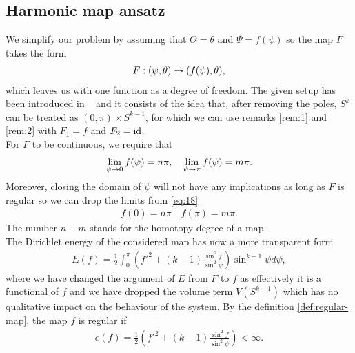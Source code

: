 \subsection{Harmonic map ansatz}
\label{sec:basic-setup}

We simplify our problem by assuming that $\Theta=\theta$ and
$\Psi=f(\psi)$ so the map $F$ takes the form
\begin{align}
  \label{eq:17}
  F:(\psi,\theta)\rightarrow(f(\psi),\theta),
\end{align}
which leaves us with one function as a degree of freedom. The given
setup has been introduced in ~\cite{Eells1964} and it consists of the
idea that, after removing the poles, $S^k$ can be treated as
$(0,\pi)\times S^{k-1}$, for which we can use remarks \ref{rem:1} and
\ref{rem:2} with $F_1=f$ and $F_2=\text{id}$.\\

For $F$ to be continuous, we require that
\begin{align}
  \label{eq:18}
  \lim_{\psi\rightarrow0}f(\psi)=n\pi,\quad\lim_{\psi\rightarrow\pi}f(\psi)=m\pi.
\end{align}
Moreover, closing the domain of $\psi$ will not have any implications
as long as $F$ is regular so we can drop the limits from \eqref{eq:18}
\begin{align}
  \label{eq:19}
  f(0)=n\pi\quad f(\pi)=m\pi.
\end{align}
The number $n-m$ stands for the homotopy degree of a
map.\\

The Dirichlet energy of the considered map has now a more transparent
form
\begin{align}
  \label{eq:20}
  E(f)=\frac{1}{2}\int_{0}^{\pi}
  \left(f'^2+(k-1)\frac{\sin^2f}{\sin^2\psi}\right) \sin^{k-1}\psi
  d\psi,
\end{align}
where we have changed the argument of $E$ from $F$ to $f$ as
effectively it is a functional of $f$ and we have dropped the volume
term $V(S^{k-1})$ which has no qualitative impact on the behaviour of
the system.
By the definition \ref{def:regular-map}, the map $f$ is regular if
\begin{align}
  \label{eq:22}
  e(f)=\frac{1}{2}\left(f'^2+(k-1)\frac{\sin^2f}{\sin^2\psi}\right)<\infty.
\end{align}

